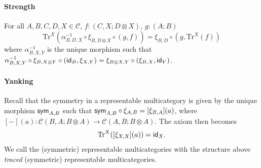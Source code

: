 \begin{example}
\paragraph{Strength} For all $A,B,C,D,X \in \mathcal{C}$, $f : (C,X;D \otimes X)$, $g : (A;B)$
\[
\text{Tr}^{X}(\alpha_{B,D,X}^{-1} \circ \xi_{B, D \otimes X} \circ (g,f)) = \xi_{B,D} \circ (g, \text{Tr}^{X}(f))
\]
where $\alpha_{B,X,Y}^{-1}$ is the unique morphism such that $\alpha_{B,X,Y}^{-1} \circ \xi_{B,X \otimes Y} \circ (\textsf{id}_{B}, \xi_{X,Y}) = \xi_{B \otimes X, Y} \circ (\xi_{B,X}, \textsf{id}_{Y})$. 
\paragraph{Yanking} Recall that the symmetry in a representable multicategory is given by the unique morphism $\textsf{sym}_{A,B}$ such that $\textsf{sym}_{A,B} \circ \xi_{A,B} = [\xi_{B,A}](a)$, where $[-](a) : \mathcal{C}(B,A; B \otimes A) \to \mathcal{C}(A,B; B \otimes A)$.
The axiom then becomes
\[
\text{Tr}^{X}([\xi_{X,X}](a)) = \textsf{id}_{X}.
\]
We call the (symmetric) representable multicategories with the structure above \emph{traced} (symmetric) representable multicategories.


\end{example}

